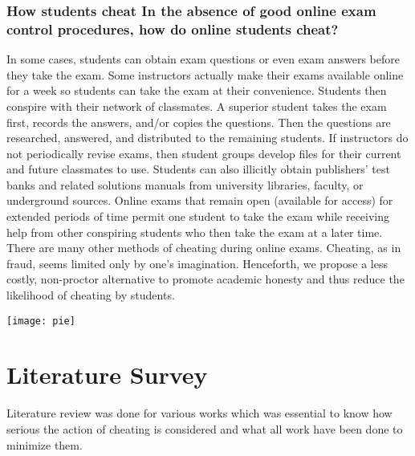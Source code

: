 \documentclass[12pt]{report}
\begin{document}
\subsubsection{How students cheat In the absence of good online exam control procedures, how do online students cheat?}

In some cases, students can obtain exam questions or even exam answers before they take the exam. Some instructors actually make their exams available online for a week so students can take the exam at their convenience. Students then conspire with their network of classmates. A superior student takes the exam first, records the answers, and/or copies the questions. Then the questions are researched, answered, and distributed to the remaining students. If instructors do not periodically revise exams, then student groups develop files for their current and future classmates to use. Students can also illicitly obtain publishers’ test banks and related solutions manuals from university libraries, faculty, or underground sources. Online exams that remain open (available for access) for extended periods of time permit one student to take the exam while receiving help from other conspiring students who then take the exam at a later time. There are many other methods of cheating during online exams. Cheating, as in fraud, seems limited only by one’s imagination.
Henceforth, we propose a less costly, non-proctor alternative to promote academic honesty and thus reduce the likelihood of cheating by students. \\
\begin{center}
\texttt{[image: pie]}
\end{center}
\newpage
\section{Literature Survey}
Literature review was done for various works which was essential to know how serious the action of cheating is considered and what all work have been done to minimize them.\\
\end{document}
